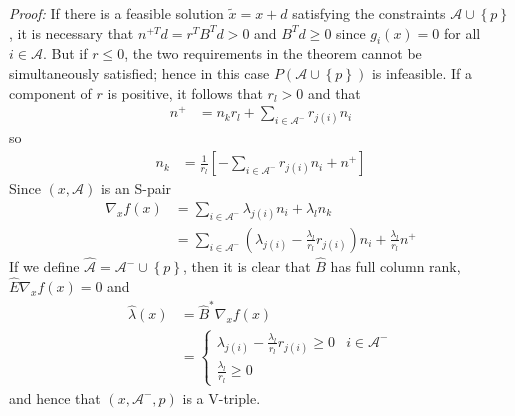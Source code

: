 \documentclass[a4paper,twoside,10pt,english]{report}
\begin{document}
\begin{framed}
\emph{Proof: }If there is a feasible solution $\tilde{x}=x+d$ satisfying
the constraints $\mathcal{A}\cup\left\{ p\right\} $, it is necessary
that $n^{+T}d=r^{T}B^{T}d>0$ and $B^{T}d \ge 0$ since $g_{i}\left(x\right)=0$
for all $i\in\mathcal{A}$. But if $r \le 0$, the two requirements
in the theorem cannot be simultaneously satisfied; hence in this case
$P\left(\mathcal{A}\cup\left\{ p\right\} \right)$ is infeasible.
If a component of $r$ is positive, it follows that $r_{l}>0$ and
that
\begin{align*}
n^{+} &= n_{k}r_{l}+\sum_{i\in\mathcal{A}^{-}}r_{j\left(i\right)}n_{i}
\end{align*}
so 
\begin{align*}
n_{k} &= \frac{1}{r_{l}}\left[-\sum_{i\in\mathcal{A}^{-}}r_{j\left(i\right)}n_{i}+n^{+}\right]
\end{align*}
Since $\left(x,\mathcal{A}\right)$ is an S-pair 
\begin{align*}
\nabla_{x}f\left(x\right) &= \sum_{i\in\mathcal{A}^{-}}\lambda_{j\left(i\right)}n_{i}+\lambda_{l}n_{k}\\
 &= \sum_{i\in\mathcal{A}^{-}}\left(\lambda_{j\left(i\right)}-\frac{\lambda_{l}}{r_{l}}r_{j\left(i\right)}\right)n_{i}+\frac{\lambda_{l}}{r_{l}}n^{+}
\end{align*}
If we define $\hat{\mathcal{A}}=\mathcal{A}^{-}\cup\left\{ p\right\} $,
then it is clear that $\hat{B}$ has full column rank, $\hat{E}\nabla_{x}f\left(x\right)=0$
and 
\begin{align*}
\hat{\lambda}\left(x\right) &= \hat{B}^{*}\nabla_{x}f\left(x\right)\\
 &= \begin{cases}
\lambda_{j\left(i\right)}-\frac{\lambda_{l}}{r_{l}}r_{j\left(i\right)}\ge0 & i\in\mathcal{A}^{-}\\
\frac{\lambda_{l}}{r_{l}}\ge0
\end{cases}
\end{align*}
and hence that $\left(x,\mathcal{A}^{-},p\right)$ is a V-triple.\end{framed}
\end{document}
